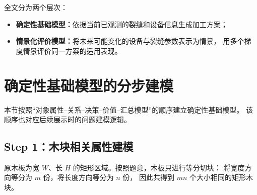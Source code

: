 ﻿\documentclass[UTF8,12pt,a4paper]{ctexart}
\begin{document}
全文分为两个层次：

\begin{itemize}
  \item \textbf{确定性基础模型：}依据当前已观测的裂缝和设备信息生成加工方案；
  \item \textbf{情景化评价模型：}将未来可能变化的设备与裂缝参数表示为情景，
        用多个梯度情景评价同一方案的适用表现。
\end{itemize}

\section{确定性基础模型的分步建模}

本节按照“对象属性--关系--决策--价值--汇总模型”的顺序建立确定性基础模型。
该顺序也对应后续展示时的问题建模逻辑。

\subsection{Step 1：木块相关属性建模}

原木板为宽 \(W\)、长 \(H\) 的矩形区域。按照题意，木板只进行等分切块：
将宽度方向等分为 \(m\) 份，将长度方向等分为 \(n\) 份，
因此共得到 \(mn\) 个大小相同的矩形木块。
\end{document}
